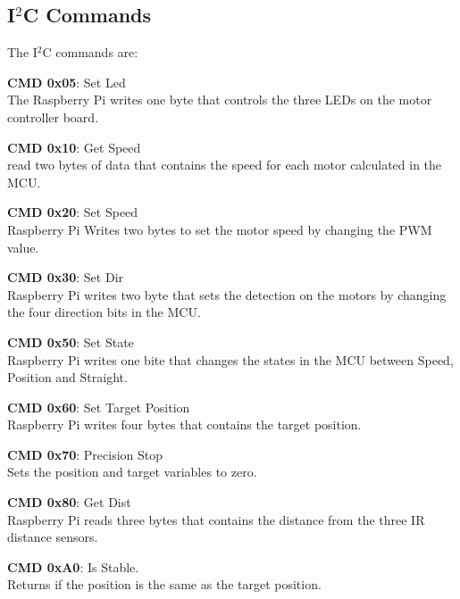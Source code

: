 \subsection{I$^2$C Commands}
The I$^2$C commands are:

\begin{itemize}
	\begin{item}
		\textbf{ CMD 0x05}: Set Led\\ The Raspberry Pi writes one byte that controls the three LEDs on the motor controller board.
	\end{item}

	\begin{item}
		\textbf{ CMD 0x10}: Get Speed\\ read two bytes of data that contains the speed for each motor calculated in the MCU.
	\end{item}
	
	\begin{item}
		\textbf{ CMD 0x20}: Set Speed \\ Raspberry Pi Writes two bytes to set the motor speed by changing the PWM value.
	\end{item}	
	
	\begin{item}
		\textbf{ CMD 0x30}: Set Dir\\ Raspberry Pi writes two byte that sets the detection on the motors by changing the four direction bits in the MCU.
	\end{item}

	\begin{item}
		\textbf{CMD 0x50}: Set State\\ Raspberry Pi writes one bite that changes the states in the MCU between Speed, Position and Straight. 
	\end{item}
	
	\begin{item}
		\textbf{ CMD 0x60}: Set Target Position\\ Raspberry Pi writes four bytes that contains the target position. 
	\end{item}
	
	\begin{item}
		\textbf{CMD 0x70}:  Precision Stop\\ Sets the position and target variables to zero.
	\end{item}

	\begin{item}
		\textbf{CMD 0x80}: Get Dist\\ Raspberry Pi reads three bytes that contains the distance from the three IR distance sensors.
	\end{item}

	\begin{item}
		\textbf{CMD 0xA0}: Is Stable. \\ Returns if the position is the same as the target position.
	\end{item}		

\end{itemize}